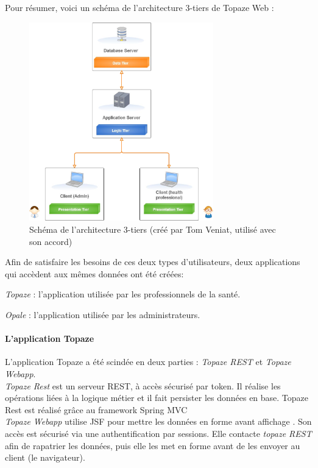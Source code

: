 Pour résumer, voici un schéma de l'architecture 3-tiers de Topaze Web :
\begin{figure}[H]
	\vspace{-10pt}
  \centering
  \includegraphics[width=8cm]{./img/architecture1}
  \caption{\label{fig:mb_va_ast} Schéma de l'architecture 3-tiers (créé par Tom Veniat, utilisé avec son accord)}
\end{figure}

Afin de satisfaire les besoins de ces deux types d'utilisateurs, deux applications qui accèdent aux mêmes données ont été créées: 

\begin{sitemize}
\item \textit{Topaze} : l'application utilisée par les professionnels de la santé. 
\item \textit{Opale} : l'application utilisée par les administrateurs.
\end{sitemize}

\paragraph*{L'application Topaze\\}
L'application Topaze a été scindée en deux parties : \textit{Topaze REST} et \textit{Topaze Webapp}.\\
\textit{Topaze Rest} est un serveur REST, à accès sécurisé par token. Il réalise les opérations liées à la logique métier et il fait persister les données en base. Topaze Rest est réalisé grâce au framework Spring MVC \cite{bib:spring}\\
\textit{Topaze Webapp} utilise JSF pour mettre les données en forme avant affichage \cite{bib:jsf}. Son accès est sécurisé via une authentification par sessions. Elle contacte \textit{topaze REST} afin de rapatrier les données, puis elle les met en forme avant de les envoyer au client (le navigateur).

